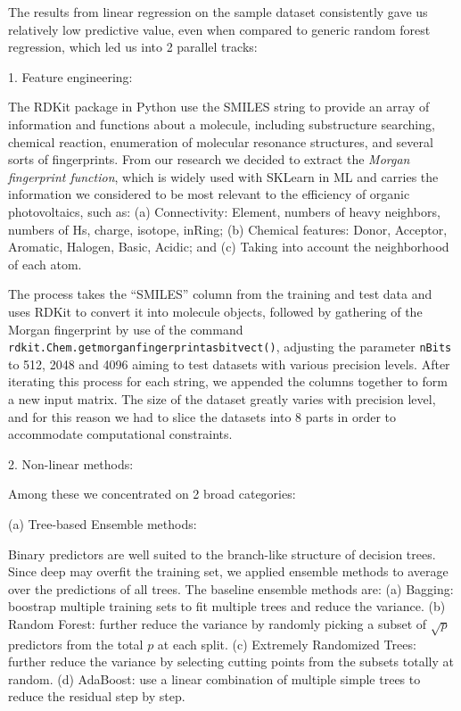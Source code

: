 \documentclass[11pt]{article}
\begin{document}
The results from linear regression on the sample dataset consistently gave us relatively low predictive value, even when compared to generic random forest regression, which led us into 2 parallel tracks:


1. Feature engineering: 

The RDKit package in Python use the SMILES string to provide an array of information and functions about a molecule, including substructure searching, chemical reaction, enumeration of molecular resonance structures, and several sorts of fingerprints. From our research we decided to extract the \emph{Morgan fingerprint function}, which is widely used with SKLearn in ML and carries the information we considered to be most relevant to the efficiency of organic photovoltaics, such as: (a) Connectivity: Element, numbers of heavy neighbors, numbers of Hs, charge, isotope, inRing; (b) Chemical features: Donor, Acceptor, Aromatic, Halogen, Basic, Acidic; and (c) Taking into account the neighborhood of each atom.

The process takes the ``SMILES'' column from the training and test data and uses RDKit to convert it into molecule objects, followed by gathering of the Morgan fingerprint by use of the command \verb|rdkit.Chem.getmorganfingerprintasbitvect()|, adjusting the parameter \verb|nBits| to 512, 2048 and 4096 aiming to test datasets with various precision levels. After iterating this process for each string, we appended the columns together to form a new input matrix. The size of the dataset greatly varies with precision level, and for this reason we had to slice the datasets into 8 parts in order to accommodate computational constraints.

2. Non-linear methods: 

Among these we concentrated on 2 broad categories:


(a) Tree-based Ensemble methods: 

Binary predictors are well suited to the branch-like structure of decision trees. Since deep may overfit the training set, we applied ensemble methods to average over the predictions of all trees. The baseline ensemble methods are: (a) Bagging: boostrap multiple training sets to fit multiple trees and reduce the variance. (b) Random Forest: further reduce the variance by randomly picking a subset of $\sqrt{p}$ predictors from the total $p$ at each split. (c) Extremely Randomized Trees: further reduce the variance by selecting cutting points from the subsets totally at random. (d) AdaBoost: use a linear combination of multiple simple trees to reduce the residual step by step.
\end{document}
